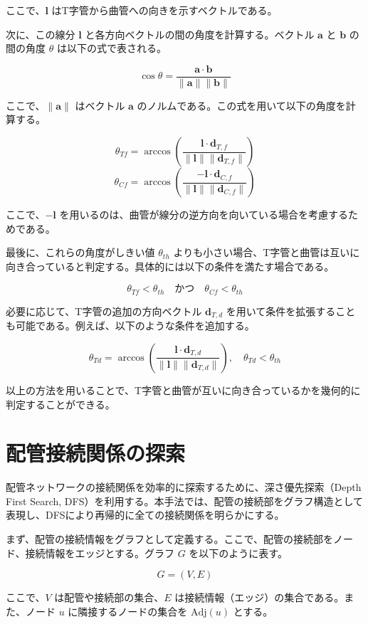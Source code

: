 ここで、$\mathbf{l}$ はT字管から曲管への向きを示すベクトルである。

次に、この線分 $\mathbf{l}$ と各方向ベクトルの間の角度を計算する。ベクトル $\mathbf{a}$ と $\mathbf{b}$ の間の角度 $\theta$ は以下の式で表される。

\[
\cos \theta = \frac{\mathbf{a} \cdot \mathbf{b}}{\|\mathbf{a}\| \|\mathbf{b}\|}
\]

ここで、$\|\mathbf{a}\|$ はベクトル $\mathbf{a}$ のノルムである。この式を用いて以下の角度を計算する。

\[
\theta_{Tf} = \arccos \left( \frac{\mathbf{l} \cdot \mathbf{d}_{T,f}}{\|\mathbf{l}\| \|\mathbf{d}_{T,f}\|} \right)
\]
\[
\theta_{Cf} = \arccos \left( \frac{-\mathbf{l} \cdot \mathbf{d}_{C,f}}{\|\mathbf{l}\| \|\mathbf{d}_{C,f}\|} \right)
\]

ここで、$-\mathbf{l}$ を用いるのは、曲管が線分の逆方向を向いている場合を考慮するためである。

最後に、これらの角度がしきい値 $\theta_{th}$ よりも小さい場合、T字管と曲管は互いに向き合っていると判定する。具体的には以下の条件を満たす場合である。

\[
\theta_{Tf} < \theta_{th} \quad \text{かつ} \quad \theta_{Cf} < \theta_{th}
\]

必要に応じて、T字管の追加の方向ベクトル $\mathbf{d}_{T,d}$ を用いて条件を拡張することも可能である。例えば、以下のような条件を追加する。

\[
\theta_{Td} = \arccos \left( \frac{\mathbf{l} \cdot \mathbf{d}_{T,d}}{\|\mathbf{l}\| \|\mathbf{d}_{T,d}\|} \right), \quad \theta_{Td} < \theta_{th}
\]

以上の方法を用いることで、T字管と曲管が互いに向き合っているかを幾何的に判定することができる。



\section{配管接続関係の探索}
配管ネットワークの接続関係を効率的に探索するために、深さ優先探索（Depth First Search, DFS）を利用する。本手法では、配管の接続部をグラフ構造として表現し、DFSにより再帰的に全ての接続関係を明らかにする。

まず、配管の接続情報をグラフとして定義する。ここで、配管の接続部をノード、接続情報をエッジとする。グラフ $G$ を以下のように表す。

\[
G = (V, E)
\]

ここで、$V$ は配管や接続部の集合、$E$ は接続情報（エッジ）の集合である。また、ノード $u$ に隣接するノードの集合を $\text{Adj}(u)$ とする。

